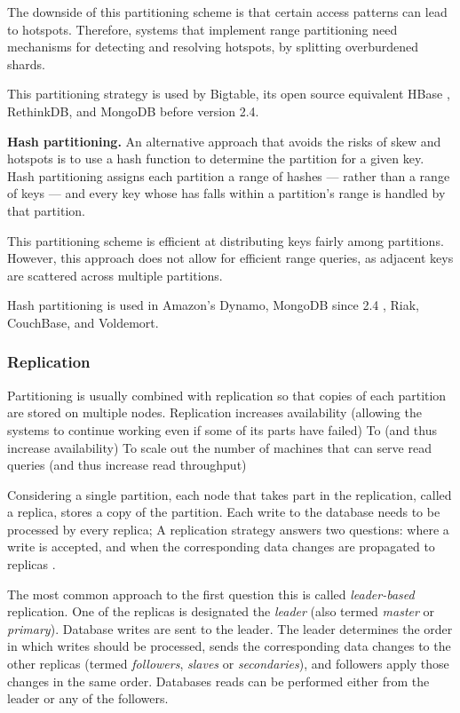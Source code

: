 The downside of this partitioning scheme is that certain access patterns can lead to hotspots.
Therefore, systems that implement range partitioning need mechanisms for detecting and resolving hotspots, by splitting
overburdened shards.

This partitioning strategy is used by Bigtable, its open source equivalent HBase \cite{hbasebigtable:comparison}, RethinkDB,
and MongoDB before version 2.4.

\bigskip
\noindent
\textbf{Hash partitioning.}
An alternative approach that avoids the risks of skew and hotspots is to use a hash function to determine the partition
for a given key.
Hash partitioning assigns each partition a range of hashes --- rather than a range of keys --- and every key whose has
falls within a partition's range is handled by that partition.

This partitioning scheme is efficient at distributing keys fairly among partitions.
However, this approach does not allow for efficient range queries, as adjacent keys are scattered across multiple
partitions.

Hash partitioning is used in Amazon's Dynamo, MongoDB since 2.4 \cite{mongo:hashpartitioning}, Riak, CouchBase,
and Voldemort.

\subsubsection{Replication}

Partitioning is usually combined with replication so that copies of each partition are stored on multiple nodes.
Replication increases availability (allowing the systems to continue working even if some of its parts have failed)
To  (and thus increase availability)
To scale out the number of machines that can serve read queries (and thus increase read throughput)

Considering a single partition, each node that takes part in the replication, called a replica, stores a copy of the
partition.
Each write to the database needs to be processed by every replica;
A replication strategy answers two questions: where a write is accepted, and when the corresponding data changes are
propagated to replicas \cite{gray:replication}.

\bigskip
\noindent
The most common approach to the first question this is called \textit{leader-based} replication.
One of the replicas is designated the \textit{leader} (also termed \textit{master} or \textit{primary}).
Database writes are sent to the leader.
The leader determines the order in which writes should be processed, sends the corresponding data changes to the other
replicas (termed \textit{followers}, \textit{slaves} or \textit{secondaries}),
and followers apply those changes in the same order.
Databases reads can be performed either from the leader or any of the followers.


